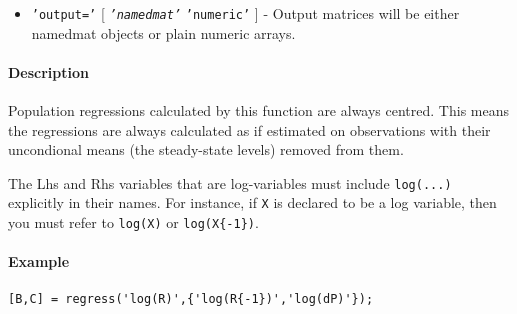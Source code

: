 \begin{itemize}
\itemsep1pt\parskip0pt
\item
  \texttt{'output='} {[} \emph{\texttt{'namedmat'}} \textbar{}
  \texttt{'numeric'} {]} - Output matrices will be either namedmat
  objects or plain numeric arrays.
\end{itemize}

\paragraph{Description}

Population regressions calculated by this function are always centred.
This means the regressions are always calculated as if estimated on
observations with their uncondional means (the steady-state levels)
removed from them.

The Lhs and Rhs variables that are log-variables must include
\texttt{log(...)} explicitly in their names. For instance, if \texttt{X}
is declared to be a log variable, then you must refer to \texttt{log(X)}
or \texttt{log(X\{-1\})}.

\paragraph{Example}

\begin{verbatim}
[B,C] = regress('log(R)',{'log(R{-1})','log(dP)'});
\end{verbatim}


